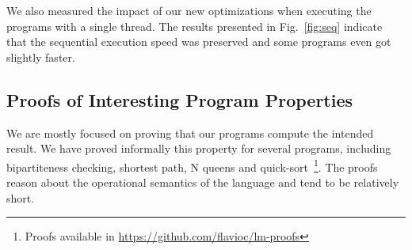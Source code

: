 \documentclass[10pt]{article}
\begin{document}
We also measured the impact of our new optimizations when executing the programs
with a single thread. The results presented in Fig.~\ref{fig:seq} indicate
that the sequential execution speed was preserved and some programs even got slightly
faster.

\subsection{Proofs of Interesting Program Properties}

We are mostly focused on proving that our programs compute the intended result.
We have proved informally this property for several programs, including
bipartiteness checking, shortest path, N queens and quick-sort~\footnote{Proofs
available in \url{https://github.com/flavioc/lm-proofs}}.
The proofs reason about the operational semantics of the language and tend to be
relatively short.
\end{document}
